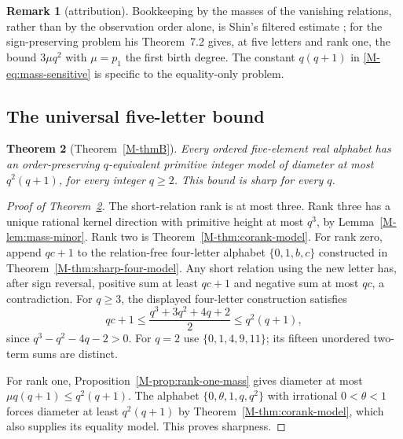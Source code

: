 \documentclass[11pt,reqno]{amsart}
\theoremstyle{plain}
\newtheorem{theorem}{Theorem}[section]
\theoremstyle{definition}
\newtheorem{remark}[theorem]{Remark}
\theoremstyle{plain}
\theoremstyle{plain}
\theoremstyle{plain}
\theoremstyle{plain}
\theoremstyle{plain}
\theoremstyle{plain}
\theoremstyle{definition}
\theoremstyle{definition}
\theoremstyle{definition}
\theoremstyle{plain}
\begin{document}
\begin{remark}[attribution]\label{M-rem:mass-attribution}
Bookkeeping by the masses of the vanishing relations, rather than by the
observation order alone, is Shin's filtered estimate
\cite[Remark~7.5]{M-Shin26}; for the sign-preserving problem his Theorem~7.2
gives, at five letters and rank one, the bound $3\mu q^2$ with $\mu=p_1$
the first birth degree. The constant $q(q+1)$ in \eqref{M-eq:mass-sensitive}
is specific to the equality-only problem.
\end{remark}


\subsection{The universal five-letter bound}
\begin{theorem}[Theorem~\ref{M-thmB}]\label{M-thm:sharp-five-model}
Every ordered five-element real alphabet has an order-preserving
$q$-equivalent primitive integer model of diameter at most $q^2(q+1)$,
for every integer $q\ge2$. This bound is sharp for every $q$.
\end{theorem}

\begin{proof}[Proof of Theorem~\ref{M-thm:sharp-five-model}]
The short-relation rank is at most three. Rank three has a unique rational
kernel direction with primitive height at most $q^3$, by
Lemma~\ref{M-lem:mass-minor}. Rank two is Theorem~\ref{M-thm:corank-model}.
For rank zero, append $qc+1$ to the relation-free four-letter alphabet
$\{0,1,b,c\}$ constructed in Theorem~\ref{M-thm:sharp-four-model}.
Any short relation using the new letter has, after sign reversal, positive
sum at least $qc+1$ and negative sum at most $qc$, a contradiction.
For $q\ge3$, the displayed four-letter construction satisfies
\[
 qc+1\le\frac{q^3+3q^2+4q+2}{2}\le q^2(q+1),
\]
since $q^3-q^2-4q-2>0$. For $q=2$ use $\{0,1,4,9,11\}$; its fifteen
unordered two-term sums are distinct.

For rank one, Proposition~\ref{M-prop:rank-one-mass} gives
diameter at most $\mu q(q+1)\le q^2(q+1)$.
The alphabet $\{0,\theta,1,q,q^2\}$ with irrational $0<\theta<1$
forces diameter at least $q^2(q+1)$ by Theorem~\ref{M-thm:corank-model},
which also supplies its equality model. This proves sharpness.
\end{proof}
\end{document}

